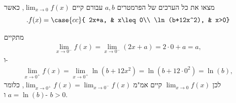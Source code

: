 מצאו את כל הערכים של הפרמטרים
$a,b$
עבורם קיים
${\displaystyle\lim_{x\to0}}f(x)$,
כאשר
\[
.f(x) = \case{cc}{
       2x+a, &  x\leq0\\ \ln(b+12x^2), & x>0}
\]
\ifsol
{}
\begin{solbox}
מתקיים
\begin{align*}
    \lim_{x\to0^-}f(x)= \lim_{x\to0^-}(2x+a)
    = 2\cdot0+a
    = a,
\end{align*}
ו-
\begin{align*}
    \lim_{x\to0^+}f(x)= \lim_{x\to0^+}\ln(b+12x^2)
    = \ln(b+12\cdot0^2)
    =\ln(b),
\end{align*}
לכן
$\lim_{x\to0}f(x)$
קיים אמ"מ
$\lim_{x\to0^+}f(x)=\lim_{x\to0^-}f(x)$,
כלומר
$a=\ln(b)$
ו-
$b>0$.
\end{solbox}
\fi
